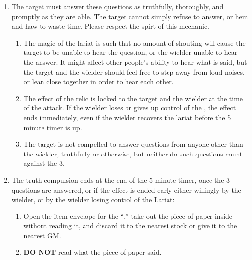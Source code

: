 \documentclass[green]{GL2020}
\begin{document}
\begin{enumerate}
\begin{enumerate}
  \end{enumerate}
  \item The target must answer these questions as truthfully, thoroughly, and promptly as they are able. The target cannot simply refuse to answer, or hem and haw to waste time. Please respect the spirt of this mechanic.
    \begin{enumerate}
    \item The magic of the lariat is such that no amount of shouting will cause the target to be unable to hear the question, or the wielder unable to hear the answer. It might affect other people’s ability to hear what is said, but the target and the wielder should feel free to step away from loud noises, or lean close together in order to hear each other.
    \item The effect of the relic is locked to the target and the wielder at the time of the attack. If the wielder loses or gives up control of the \iLariat{}, the effect ends immediately, even if the wielder recovers the lariat before the 5 minute timer is up.
    \item The target is not compelled to answer questions from anyone other than the wielder, truthfully or otherwise, but neither do such questions count against the 3.
  \end{enumerate}
  \item The truth compulsion ends at the end of the 5 minute timer, once the 3 questions are answered, or if the effect is ended early either willingly by the wielder, or by the wielder losing control of the Lariat:
  \begin{enumerate}
    \item Open the item-envelope for the ``\iLariat{},'' take out the piece of paper inside without reading it, and discard it to the nearest stock or give it to the nearest GM.
    \item \textbf{DO NOT} read what the piece of paper said.
  \end{enumerate}
\end{enumerate}
\end{document}

